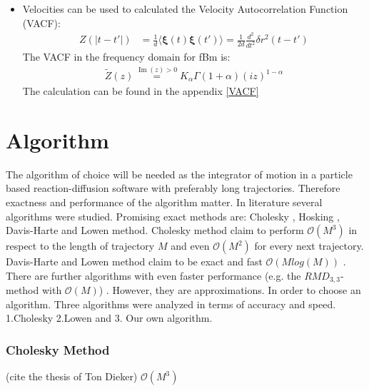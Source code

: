 \documentclass[
  a4paper,BCOR10mm,oneside,
  headsepline,footsepline,%
  fleqn,openbib
]{scrbook}
\begin{document}
\begin{itemize} 
\item Velocities can be used to calculated the Velocity Autocorrelation Function (VACF):
\begin{align}
Z(|t-t'|)&= \frac{1}{d}\langle \bm{\xi}(t) \bm{\xi}(t') \rangle = \frac{1}{2d} \frac{d^2}{dt^2} \delta r^2 (t-t')  
\end{align}
The VACF in the frequency domain for fBm is: 
\begin{align}
  \tilde{Z}(z) \stackrel{\operatorname{Im}(z)> 0} {=}  K_{\alpha} \Gamma(1+\alpha)(i z)^{1-\alpha}
\end{align}
The calculation can be found in the appendix \ref{VACF}
\end{itemize}
\section{Algorithm}
The algorithm of choice will be needed as the integrator of motion in a particle based reaction-diffusion software with preferably long trajectories. Therefore exactness and performance of the algorithm matter. In literature several algorithms were studied. Promising exact methods are: Cholesky \cite{Dieker2004}, Hosking \cite{WRCR:WRCR3676}, Davis-Harte \cite{Dieker2004} and  Lowen \cite{Lowen1999} method. Cholesky  method claim to perform $\mathcal{O}(M^3)$ in respect to the length of trajectory $M$ and even $\mathcal{O}(M^2)$ for every next trajectory. Davis-Harte and Lowen method claim to be exact and fast $\mathcal{O}(M log(M))$ \cite{DAVIES1987}\cite{Lowen1999}. There are further algorithms with even faster performance (e.g. the $RMD_{3,3}$- method \cite{Dieker2004} with $\mathcal{O}(M)$) . However, they are approximations. In order to choose an algorithm. Three algorithms were analyzed in terms of accuracy and speed. 1.Cholesky  2.Lowen and 3. Our own algorithm.
\subsubsection{Cholesky Method}
(cite the thesis of Ton Dieker)
$\mathcal{O}(M^3)$
\end{document}

